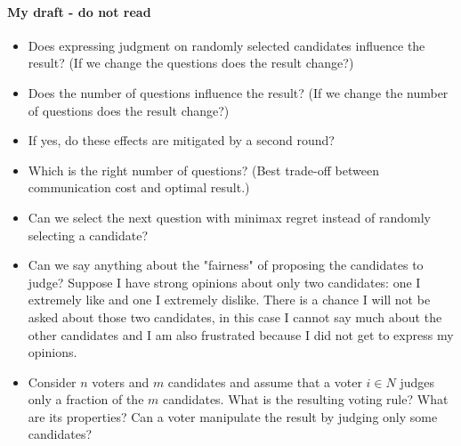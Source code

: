 \documentclass[version=3.21, pagesize, twoside=off, bibliography=totoc, DIV=calc, fontsize=12pt, a4paper]{scrartcl}
\begin{document}
\paragraph{My draft - do not read}
\begin{itemize}
	\item Does expressing judgment on randomly selected candidates influence the result? (If we change the questions does the result change?)
	\item Does the number of questions influence the result? (If we change the number of questions does the result change?)
	\item If yes, do these effects are mitigated by a second round?
	\item Which is the right number of questions? (Best trade-off between communication cost and optimal result.)
	\item Can we select the next question with minimax regret instead of randomly selecting a candidate?
	\item Can we say anything about the "fairness" of proposing the candidates to judge? Suppose I have strong opinions about only two candidates: one I extremely like and one I extremely dislike. There is a chance I will not be asked about those two candidates, in this case I cannot say much about the other candidates and I am also frustrated because I did not get to express my opinions.
	\item Consider $n$ voters and $m$ candidates and assume that a voter $i \in N$ judges only a fraction of the $m$ candidates. What is the resulting voting rule? What are its properties? Can a voter manipulate the result by judging only some candidates? 
\end{itemize}

\newpage

\newpage
\appendix
\end{document}
